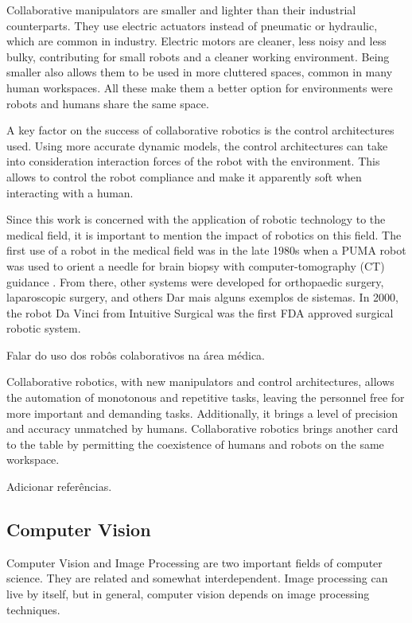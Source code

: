 Collaborative manipulators are smaller and lighter than their industrial counterparts. They use electric actuators instead of pneumatic or hydraulic, which are common in industry. Electric motors are cleaner, less noisy and less bulky, contributing for small robots and a cleaner working environment. Being smaller also allows them to be used in more cluttered spaces, common in many human workspaces. All these make them a better option for environments were robots and humans share the same space.

A key factor on the success of collaborative robotics is the control architectures used. Using more accurate dynamic models, the control architectures can take into consideration interaction forces of the robot with the environment. This allows to control the robot compliance and make it apparently soft when interacting with a human.

Since this work is concerned with the application of robotic technology to the medical field, it is important to mention the impact of robotics on this field. The first use of a robot in the medical field was in the late 1980s when a PUMA robot was used to orient a needle for brain biopsy with computer-tomography (CT) guidance \cite{Kwoh1988_puma_brain_surgery}. From there, other systems were developed for orthopaedic surgery, laparoscopic surgery, and others {\color{red} Dar mais alguns exemplos de sistemas}. In 2000, the robot Da Vinci from Intuitive Surgical was the first FDA approved surgical robotic system.

{\color{red} Falar do uso dos robôs colaborativos na área médica.}

Collaborative robotics, with new manipulators and control architectures, allows the automation of monotonous and repetitive tasks, leaving the personnel free for more important and demanding tasks. Additionally, it brings a level of precision and accuracy unmatched by humans. Collaborative robotics brings another card to the table by permitting the coexistence of humans and robots on the same workspace.

{\color{red} Adicionar referências.}


\subsection{Computer Vision} %
\label{subsec:computer_vision}

Computer Vision and Image Processing are two important fields of computer science. They are related and somewhat interdependent. Image processing can live by itself, but in general, computer vision depends on image processing techniques.

